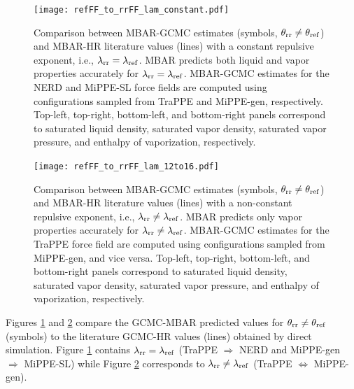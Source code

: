 \documentclass[journal=jced,manuscript=article]{achemso}
\begin{document}

	\begin{figure}[H]
		\centering
		\texttt{[image: refFF\_to\_rrFF\_lam\_constant.pdf]}
		\caption{Comparison between MBAR-GCMC estimates (symbols, $\theta_{\rm rr} \neq \theta_{\rm ref}$) and MBAR-HR literature values\cite{Potoff_branched} (lines) with a constant repulsive exponent, i.e., $\lambda_{\rm rr} = \lambda_{\rm ref}$. MBAR predicts both liquid and vapor properties accurately for $\lambda_{\rm rr} = \lambda_{\rm ref}$. MBAR-GCMC estimates for the NERD and MiPPE-SL force fields are computed using configurations sampled from TraPPE and MiPPE-gen, respectively. Top-left, top-right, bottom-left, and bottom-right panels correspond to saturated liquid density, saturated vapor density, saturated vapor pressure, and enthalpy of vaporization, respectively.}
		\label{fig:refFF_to_rrFF_lam_constant}
	\end{figure}
	
	\begin{figure}[H]
		\centering
		\texttt{[image: refFF\_to\_rrFF\_lam\_12to16.pdf]}
		\caption{Comparison between MBAR-GCMC estimates (symbols, $\theta_{\rm rr} \neq \theta_{\rm ref}$) and MBAR-HR literature values\cite{Potoff_branched} (lines) with a non-constant repulsive exponent, i.e., $\lambda_{\rm rr} \neq \lambda_{\rm ref}$. MBAR predicts only vapor properties accurately for $\lambda_{\rm rr} \neq \lambda_{\rm ref}$. MBAR-GCMC estimates for the TraPPE force field are computed using configurations sampled from MiPPE-gen, and vice versa. Top-left, top-right, bottom-left, and bottom-right panels correspond to saturated liquid density, saturated vapor density, saturated vapor pressure, and enthalpy of vaporization, respectively.}
		\label{fig:refFF_to_rrFF_lam12to16}
	\end{figure}

Figures \ref{fig:refFF_to_rrFF_lam_constant} and \ref{fig:refFF_to_rrFF_lam12to16} compare the GCMC-MBAR predicted values for $\theta_{\rm rr} \neq \theta_{\rm ref}$ (symbols) to the literature GCMC-HR values (lines) obtained by direct simulation. Figure \ref{fig:refFF_to_rrFF_lam_constant} contains $\lambda_{\rm rr} = \lambda_{\rm ref}$ (TraPPE $\Rightarrow$ NERD and MiPPE-gen $\Rightarrow$ MiPPE-SL) while Figure \ref{fig:refFF_to_rrFF_lam12to16} corresponds to $\lambda_{\rm rr} \neq \lambda_{\rm ref}$ (TraPPE $\Leftrightarrow$ MiPPE-gen). 
\end{document}
